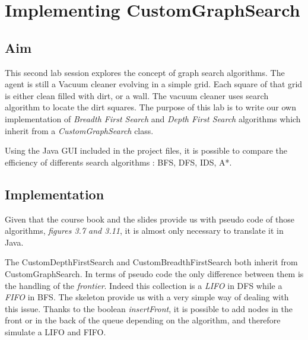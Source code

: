 \section{Implementing CustomGraphSearch}
 \thispagestyle{empty}
\subsection{Aim}

This second lab session explores the concept of graph search algorithms. The
agent is still a Vacuum cleaner evolving in a simple grid.
Each square of that grid is either clean filled with dirt, or a wall.
The vacuum cleaner uses search algorithm to locate the dirt squares.
The purpose of this lab is to write our own implementation of
\textit{Breadth First Search} and \textit{Depth First Search} algorithms which
inherit from a \textit{CustomGraphSearch} class.

Using the Java GUI included in the project files, it is possible to compare the
efficiency of differents search algorithms : BFS, DFS, IDS, A*.


\subsection{Implementation}

Given that the course book and the slides provide us with pseudo code of those
algorithms, \textit{figures 3.7 and 3.11}, it is almost only necessary to translate it in Java.

The CustomDepthFirstSearch and CustomBreadthFirstSearch both inherit from
CustomGraphSearch. In terms of pseudo code the only difference between
them is the handling of the \textit{frontier}. Indeed this collection is a
\textit{LIFO} in DFS while a \textit{FIFO} in BFS. The skeleton provide us with
a very simple way of dealing with this issue. Thanks to the boolean \textit{insertFront},
it is possible to add nodes in the front or in the back of the queue depending
on the algorithm, and therefore simulate a LIFO and FIFO.

